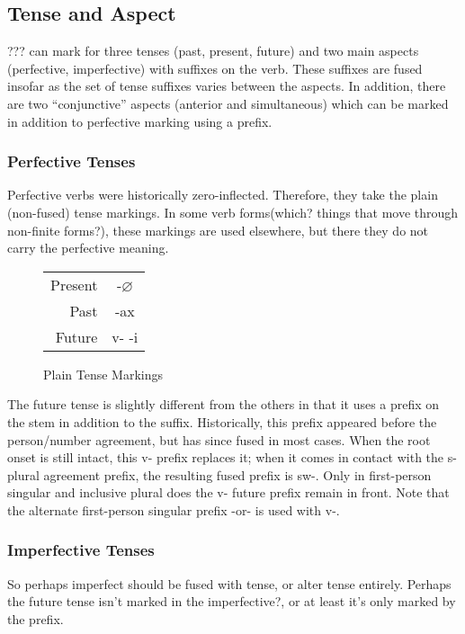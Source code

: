 \documentclass[12pt]{book} %
\begin{document}
\subsection{Tense and Aspect}

??? can mark for three tenses (past, present, future) and two main aspects (perfective, imperfective) with suffixes on the verb.
These suffixes are fused insofar as the set of tense suffixes varies between the aspects.
In addition, there are two ``conjunctive'' aspects (anterior and simultaneous) which can be marked in addition to perfective marking using a prefix.

\subsubsection{Perfective  Tenses}

Perfective verbs were historically zero-inflected.
Therefore, they take the plain (non-fused) tense markings.
{\color{orange}In some verb forms{\color{red}(which? things that move through non-finite forms?)}, these markings are used elsewhere, but there they do not carry the perfective meaning.}

\begin{figure}[H]
\centering
	\begin{tabular}{rc}
		Present	& -$\varnothing$	\\
		Past		& -ax	\\
		Future	& v- -i	\\
	\end{tabular}
\caption{Plain Tense Markings}\label{t:plain-tense}
\end{figure}

The future tense is slightly different from the others in that it uses a prefix on the stem in addition to the suffix.
Historically, this prefix appeared before the person/number agreement, but has since fused in most cases.
When the root onset is still intact, this v- prefix replaces it; when it comes in contact with the s- plural agreement prefix, the resulting fused prefix is sw-.
Only in first-person singular and inclusive plural does the v- future prefix remain in front.
Note that the alternate first-person singular prefix -or- is used with v-.


\subsubsection{Imperfective Tenses}

{\color{orange}
So perhaps imperfect should be fused with tense, or alter tense entirely.
Perhaps the future tense isn't marked in the imperfective?, or at least it's only marked by the prefix.
}
\end{document}
